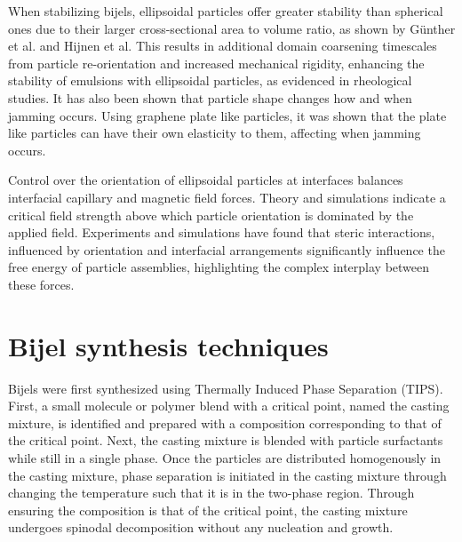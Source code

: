 When stabilizing bijels, ellipsoidal particles offer greater stability than spherical ones due to their larger cross-sectional area to volume ratio, 
as shown by Günther et al. and Hijnen et al. \cite{gunther_timescales_2014, hijnen_bijels_2015} This results in additional domain coarsening timescales 
from particle re-orientation and increased mechanical rigidity, enhancing the stability of emulsions with ellipsoidal particles, as evidenced in rheological 
studies. \cite{gunther_timescales_2014, daware_emulsions_2015, witt_bijel_2013} It has also been shown that particle shape changes how and when jamming occurs. 
Using graphene plate like particles, it was shown that the plate like particles can have their own elasticity to them, affecting when jamming occurs. 
\cite{imperiali_simple_2014, sun_assembly_2013}

Control over the orientation of ellipsoidal particles at interfaces balances interfacial capillary and magnetic field forces. 
\cite{bresme_orientational_2007, davies_assembling_2014} Theory and simulations indicate a critical field strength above which particle orientation 
is dominated by the applied field. \cite{bresme_orientational_2007, davies_assembling_2014} Experiments and simulations have found that steric interactions, 
influenced by orientation and interfacial arrangements significantly influence the free energy of particle assemblies, highlighting the complex interplay 
between these forces. \cite{morgan_understanding_2013, newton_influence_2014, newton_capillary_2018}


\section{Bijel synthesis techniques}

Bijels were first synthesized using Thermally Induced Phase Separation (TIPS). \cite{herzig_bicontinuous_2007, lee_bicontinuous_2010, bai_dynamics_2015} 
First, a small molecule or polymer blend with a critical point, named the casting mixture, is identified and prepared with a composition corresponding to 
that of the critical point. Next, the casting mixture is blended with particle surfactants while still in a single phase. Once the particles are distributed 
homogenously in the casting mixture, phase separation is initiated in the casting mixture through changing the temperature such that it is in the two-phase region. 
Through ensuring the composition is that of the critical point, the casting mixture undergoes spinodal decomposition without any nucleation and growth. 

